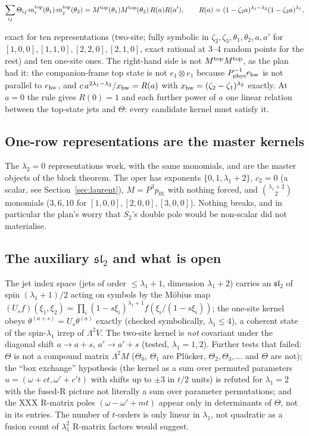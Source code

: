 \documentclass[11pt]{article}
\begin{document}
\begin{equation}
\sum_{ij}\Theta_{ij}\,m_i^{\rm top}(\theta_1)\,m_j^{\rm top}(\theta_2)=M^{\rm top}(\theta_1)M^{\rm top}(\theta_2)\,R(a)R(a'),\qquad R(a)=(1-\zeta_2a)^{\lambda_1-\lambda_2}(1-\zeta_3a)^{\lambda_1},\label{eq:sumrule}
\end{equation}

exact for ten representations (two-site; fully symbolic in $\zeta_2,\zeta_3,\theta_1,\theta_2,a,a'$ for $[1,0,0],[1,1,0],[2,2,0],[2,1,0]$, exact rational at 3--4 random points for the rest) and ten one-site ones.
The right-hand side is not $M^{\rm top}M^{\rm top}$, as the plan had it: the companion-frame top state is not $e_1\otimes e_1$ because $P_{\rm phys}^{-1}e_{\rm hw}$ is not parallel to $e_{\rm hw}$, and $c\,a^{2\lambda_1-\lambda_2}/x_{\rm hw}=R(a)$ with $x_{\rm hw}=(\zeta_2-\zeta_1)^{\lambda_2}$ exactly.
At $a=0$ the rule gives $R(0)=1$ and each further power of $a$ one linear relation between the top-state jets and $\Theta$: every candidate kernel must satisfy it.

\subsection{One-row representations are the master kernels}\label{sec:master}

The $\lambda_2=0$ representations work, with the same monomials, and are the master objects of the block theorem.
The oper has exponents $\{0,1,\lambda_1+2\}$, $c_2=0$ (a scalar, see Section~\ref{sec:laurent}), $M=P^3p_{01}$ with nothing forced, and $\binom{\lambda_1+2}2$ monomials ($3,6,10$ for $[1,0,0],[2,0,0],[3,0,0]$).
Nothing breaks, and in particular the plan's worry that $S_2$'s double pole would be non-scalar did not materialise.

\subsection{The auxiliary \texorpdfstring{$\mathfrak{sl}_2$}{sl} and what is open}\label{sec:auxsl2}

The jet index space (jets of order $\le\lambda_1+1$, dimension $\lambda_1+2$) carries an $\mathfrak{sl}_2$ of spin $(\lambda_1+1)/2$ acting on symbols by the M\"obius map $(U_sf)(\xi_1,\xi_2)=\prod_i(1-s\xi_i)^{\lambda_1+1}f(\xi_i/(1-s\xi_i))$; the one-site kernel obeys $\theta^{(a+s)}=U_s\theta^{(a)}$ exactly (checked symbolically, $\lambda_1\le4$), a coherent state of the spin-$\lambda_1$ irrep of $\Lambda^2V$. The two-site kernel is \emph{not} covariant under the diagonal shift $a\to a+s$, $a'\to a'+s$ (tested, $\lambda_1=1,2$).
Further tests that failed: $\Theta$ is not a compound matrix $\Lambda^2M$ ($\Theta_0$, $\Theta_1$ are Plücker, $\Theta_2,\Theta_3,\dots$ and $\Theta$ are not); the ``box exchange'' hypothesis (the kernel as a sum over permuted parameters $u=(\omega+ct,\omega'+c't)$ with shifts up to $\pm3$ in $t/2$ units) is refuted for $\lambda_1=2$ with the fused-R picture not literally a sum over parameter permutations; and the XXX R-matrix poles $(\omega-\omega'+mt)$ appear only in determinants of $\Theta$, not in its entries.
The number of $t$-orders is only linear in $\lambda_1$, not quadratic as a fusion count of $\lambda_1^2$ R-matrix factors would suggest.
\end{document}
